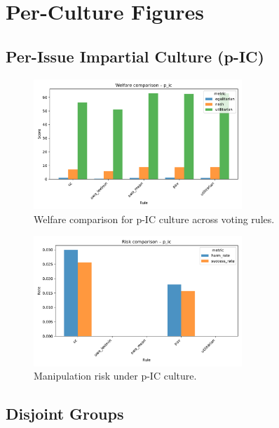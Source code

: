 \documentclass[11pt]{article}
\begin{document}
\clearpage
\listoffigures

\appendix
\section{Per-Culture Figures}

\subsection{Per-Issue Impartial Culture (p-IC)}

\begin{figure}[h!]
\centering
\includegraphics[width=0.7\textwidth]{figures/welfare_comparison_p_ic.pdf}
\caption{Welfare comparison for p-IC culture across voting rules.}
\end{figure}

\begin{figure}[h!]
\centering
\includegraphics[width=0.7\textwidth]{figures/risk_comparison_p_ic.pdf}
\caption{Manipulation risk under p-IC culture.}
\end{figure}

\subsection{Disjoint Groups}
\end{document}
